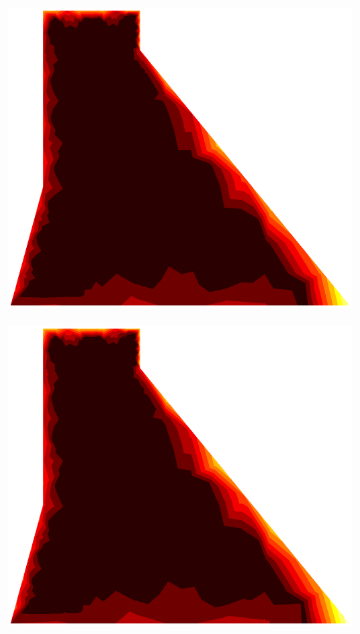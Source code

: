 \documentclass[10pt, a4paper]{article}
\begin{document}
\begin{figure}[H]
\begin{subfigure}[H]{0.19\textwidth}
		\includegraphics[width=1.2\textwidth]{fig/4.eps}
	\end{subfigure}
		\begin{subfigure}[H]{0.19\textwidth}
		\includegraphics[width=1.2\textwidth]{fig/5.eps}
	\end{subfigure}
	\begin{subfigure}[H]{0.19\textwidth}

\end{subfigure}
\end{figure}
\end{document}
